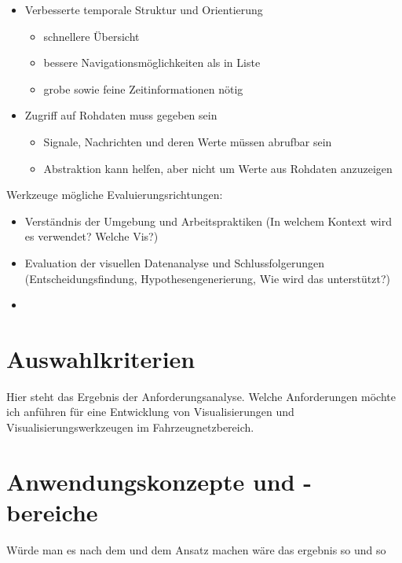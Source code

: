 \documentclass[draft=false
              ,paper=a4
              ,twoside=false
              ,fontsize=11pt
              ,headsepline
              ,BCOR10mm
              ,DIV11
              ]{scrbook}
\newcommand{\TODO}[1]{\colorbox{yellow}{\textcolor{red}{[TODO: #1]}}}
\begin{document}
\begin{itemize}
  \item Verbesserte temporale Struktur und Orientierung
    \begin{itemize}
    \item schnellere Übersicht
    \item bessere Navigationsmöglichkeiten als in Liste
    \item grobe sowie feine Zeitinformationen nötig
  \end{itemize}
  \item Zugriff auf Rohdaten muss gegeben sein
  \begin{itemize}
    \item Signale, Nachrichten und deren Werte müssen abrufbar sein
    \item Abstraktion kann helfen, aber nicht um Werte aus Rohdaten anzuzeigen
  \end{itemize}
\end{itemize}

Werkzeuge mögliche Evaluierungsrichtungen:

\begin{itemize}
  \item Verständnis der Umgebung und Arbeitspraktiken (In welchem Kontext wird es verwendet? Welche Vis?)
  \item Evaluation der visuellen Datenanalyse und Schlussfolgerungen (Entscheidungsfindung, Hypothesengenerierung, Wie wird das unterstützt?)
  \item 
\end{itemize}

\chapter{Auswahlkriterien} %
\label{cha:auswahlkriterien}
Hier steht das Ergebnis der Anforderungsanalyse. Welche Anforderungen möchte ich anführen für eine Entwicklung von Visualisierungen und Visualisierungswerkzeugen im Fahrzeugnetzbereich.

\chapter{Anwendungskonzepte und -bereiche} %
\label{cha:anwendungskonzepte_und_bereiche}

Würde man es nach dem und dem Ansatz machen wäre das ergebnis so und so
\end{document}
